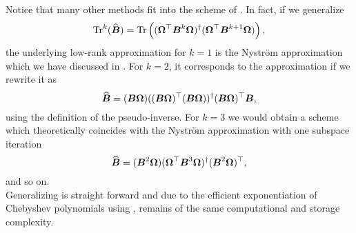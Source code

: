 Notice that many other methods \cite{halko2011finding,tropp2023randomized} fit
into the scheme of . In fact, if we
generalize
\begin{equation}
    \operatorname{Tr}^{k}(\widehat{\boldsymbol{B}})
        = \operatorname{Tr}\left((\boldsymbol{\Omega}^{\top} \boldsymbol{B}^k \boldsymbol{\Omega})^{\dagger} (\boldsymbol{\Omega}^{\top} \boldsymbol{B}^{k+1} \boldsymbol{\Omega}) \right),
    \label{equ:3-nystrom-trace-generalization}
\end{equation}
the underlying low-rank approximation for $k=1$ is the Nystr\"om approximation
which we have discussed in .
For $k=2$, it corresponds to the approximation 
if we rewrite it as
\begin{equation}
    \widehat{\boldsymbol{B}} = (\boldsymbol{B} \boldsymbol{\Omega}) ((\boldsymbol{B} \boldsymbol{\Omega})^{\top} (\boldsymbol{B} \boldsymbol{\Omega}))^{\dagger} (\boldsymbol{B} \boldsymbol{\Omega})^{\top} \boldsymbol{B},
    \label{equ:3-nystrom-RSVD-rewritten}
\end{equation}
using the definition of the pseudo-inverse.
For $k=3$ we would obtain a scheme which theoretically coincides with the Nystr\"om
approximation with one subspace iteration \cite{tropp2023randomized}
\begin{equation}
    \widehat{\boldsymbol{B}} = (\boldsymbol{B}^2 \boldsymbol{\Omega}) (\boldsymbol{\Omega}^{\top} \boldsymbol{B}^3 \boldsymbol{\Omega})^{\dagger} (\boldsymbol{B}^2 \boldsymbol{\Omega})^{\top},
    \label{equ:3-nystrom-nystrom-SI}
\end{equation}
and so on.\\

Generalizing  is straight forward and
due to the efficient exponentiation of Chebyshev polynomials using
, remains of the same
computational and storage complexity.
